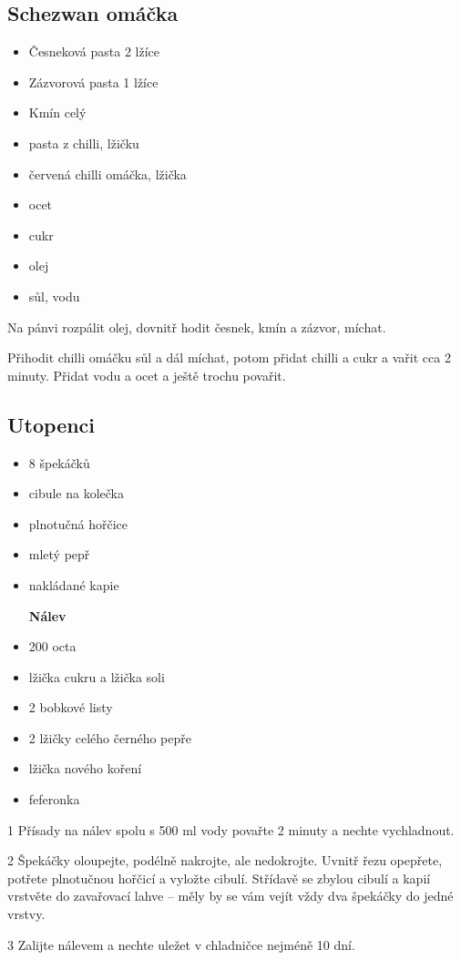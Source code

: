 \documentclass[10pt,a4paper]{article}
\newenvironment{myitemize}
{ \begin{itemize}
    \setlength{\itemsep}{0pt}
    \setlength{\parskip}{0pt}
    \setlength{\parsep}{0pt}     }
{ \end{itemize}                  }
\begin{document}
\subsection{Schezwan omáčka}
\begin{minipage}[t]{0,5\textwidth}
\begin{myitemize} 
\item Česneková pasta 2 lžíce
\item Zázvorová pasta 1 lžíce
\item Kmín celý
\item pasta z chilli, lžičku
\item červená chilli omáčka, lžička
\item ocet
\item cukr
\item olej
\item sůl, vodu
\end{myitemize}
\end{minipage}
\begin{minipage}[t]{0,5\textwidth}
Na pánvi rozpálit olej, dovnitř hodit česnek, kmín a zázvor, míchat.

Přihodit chilli omáčku sůl a dál míchat, potom přidat chilli a cukr a vařit cca 2 minuty. Přidat vodu a ocet a ještě trochu povařit.
\end{minipage}

\subsection{Utopenci}
\begin{minipage}[t]{0,5\textwidth}
\begin{myitemize} 
\item 8 špekáčků
\item cibule na kolečka
\item plnotučná hořčice
\item mletý pepř
\item nakládané kapie

\textbf{Nálev}
\item 200 octa
\item lžička cukru a lžička soli
\item 2 bobkové listy
\item 2 lžičky celého černého pepře
\item lžička nového koření
\item feferonka
\end{myitemize}
\end{minipage}
\begin{minipage}[t]{0,5\textwidth}
1 Přísady na nálev spolu s 500 ml vody povařte 2 minuty a nechte vychladnout.

2 Špekáčky oloupejte, podélně nakrojte, ale nedokrojte. Uvnitř řezu opepřete, potřete plnotučnou hořčicí a vyložte cibulí. Střídavě se zbylou cibulí a kapií vrstvěte do zavařovací lahve – měly by se vám vejít vždy dva špekáčky do jedné vrstvy.

3 Zalijte nálevem a nechte uležet v chladničce nejméně 10 dní.
\end{minipage}
\end{document}
